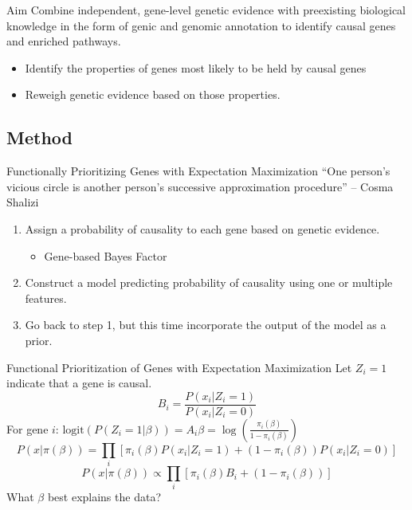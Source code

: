 \documentclass[bigger]{beamer}
\begin{document}
\begin{frame}{Aim}
  Combine independent, gene-level genetic evidence with preexisting biological knowledge in the form of genic and genomic annotation to identify causal genes and enriched pathways.
  \begin{itemize}
  \item Identify the properties of genes most likely to be held by causal genes
  \item Reweigh genetic evidence based on those properties.
  \end{itemize}
\end{frame}

\subsection{Method}

\begin{frame}{Functionally Prioritizing Genes with Expectation Maximization}
 ``One person's vicious circle is another person's successive approximation procedure'' -- Cosma Shalizi\\
  \begin{enumerate}
  \item Assign a probability of causality to each gene based on genetic evidence.
    \begin{itemize}
    \item Gene-based Bayes Factor
    \end{itemize}
  \item Construct a model predicting probability of causality using one or multiple features.
  \item Go back to step 1, but this time incorporate the output of the model as a prior.
  \end{enumerate}
\end{frame}

\begin{frame}{Functional Prioritization of Genes with Expectation Maximization}
  Let $Z_i=1$ indicate that a gene is causal.\\
  \[B_i=\frac{P(x_i|Z_i=1)}{P(x_i|Z_i=0)}\]
  For gene $i$: $\text{logit}(P(Z_i=1|\beta)) = A_i\beta=\log(\frac{\pi_i(\beta)}{1-\pi_i(\beta)})$\\
  \pause
  \[P(x|\pi(\beta)) =\prod_i [ \pi_i(\beta)P(x_i|Z_i=1)+(1-\pi_i(\beta))P(x_i|Z_i=0)]\]
  \[P(x|\pi(\beta)) \propto \prod_i [\pi_i(\beta)B_i+(1-\pi_i(\beta))]\]
  \pause
  What $\beta$ best explains the data?
\end{frame}
\end{document}
